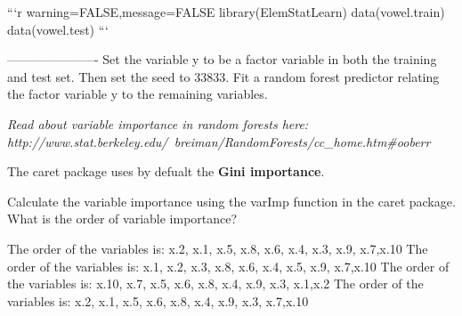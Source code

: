 ```{r warning=FALSE,message=FALSE}
library(ElemStatLearn)
data(vowel.train)
data(vowel.test) 
```

---------------------- %
Set the variable y to be a factor variable in both the training and test set. Then set the seed to 33833. Fit a random forest predictor relating the factor variable y to the remaining variables. 

\textit{Read about variable importance in random forests here: http://www.stat.berkeley.edu/~breiman/RandomForests/cc\_home.htm\#ooberr} 

The caret package uses by defualt the \textbf{Gini importance}. 

Calculate the variable importance using the varImp function in the caret package. What is the order of variable importance?

The order of the variables is:
x.2, x.1, x.5, x.8, x.6, x.4, x.3, x.9, x.7,x.10
 The order of the variables is:
x.1, x.2, x.3, x.8, x.6, x.4, x.5, x.9, x.7,x.10
 The order of the variables is:
x.10, x.7, x.5, x.6, x.8, x.4, x.9, x.3, x.1,x.2
 The order of the variables is:
x.2, x.1, x.5, x.6, x.8, x.4, x.9, x.3, x.7,x.10
